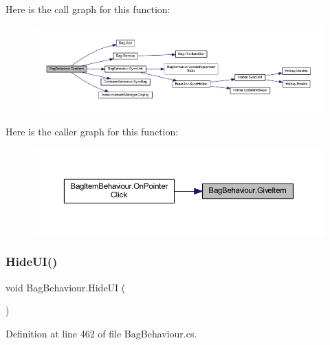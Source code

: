 Here is the call graph for this function\+:
\nopagebreak
\begin{figure}[H]
\begin{center}
\leavevmode
\includegraphics[width=350pt]{class_bag_behaviour_ac72b22f2f0340663e461c4a10f33281d_cgraph}
\end{center}
\end{figure}
Here is the caller graph for this function\+:
\nopagebreak
\begin{figure}[H]
\begin{center}
\leavevmode
\includegraphics[width=350pt]{class_bag_behaviour_ac72b22f2f0340663e461c4a10f33281d_icgraph}
\end{center}
\end{figure}
\mbox{\label{class_bag_behaviour_a731b060bd01b971246839664dfd86530}} 
\subsubsection{\texorpdfstring{HideUI()}{HideUI()}}
{\footnotesize\ttfamily void Bag\+Behaviour.\+Hide\+UI (\begin{DoxyParamCaption}{ }\end{DoxyParamCaption})}



Definition at line 462 of file Bag\+Behaviour.\+cs.

